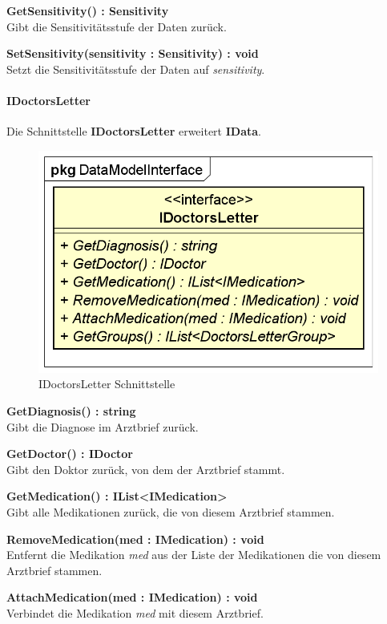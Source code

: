 \documentclass[a4paper]{scrreprt}
\begin{document}
\textbf{GetSensitivity() : Sensitivity}\\
Gibt die Sensitivitätsstufe der Daten zurück.

\textbf{SetSensitivity(sensitivity : Sensitivity) : void}\\
Setzt die Sensitivitätsstufe der Daten auf \textit{sensitivity}.

\paragraph{IDoctorsLetter}
Die Schnittstelle \textbf{IDoctorsLetter} erweitert \textbf{IData}.

\begin{figure}[H]
\centering
\includegraphics[width=0.75\textheight]{graphics/Klassendiagramme/Model/IDoctorsLetter.png}
\caption{IDoctorsLetter Schnittstelle}
\end{figure}
\textbf{GetDiagnosis() : string}\\
Gibt die Diagnose im Arztbrief zurück.

\textbf{GetDoctor() : IDoctor}\\
Gibt den Doktor zurück, von dem der Arztbrief stammt.

\textbf{GetMedication() : IList<IMedication>}\\
Gibt alle Medikationen zurück, die von diesem Arztbrief stammen.

\textbf{RemoveMedication(med : IMedication) : void}\\
Entfernt die Medikation \textit{med} aus der Liste der Medikationen die von diesem Arztbrief stammen.

\textbf{AttachMedication(med : IMedication) : void}\\
Verbindet die Medikation \textit{med} mit diesem Arztbrief.
\end{document}
